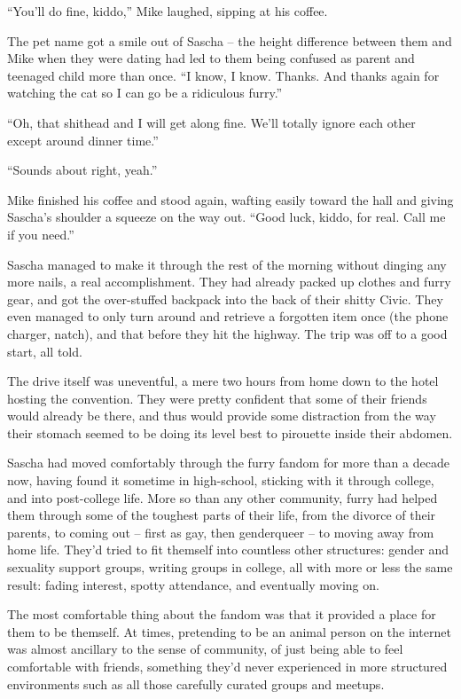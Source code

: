 ``You'll do fine, kiddo,'' Mike laughed, sipping at his coffee.

The pet name got a smile out of Sascha -- the height difference between them and Mike when they were dating had led to them being confused as parent and teenaged child more than once. ``I know, I know. Thanks. And thanks again for watching the cat so I can go be a ridiculous furry.''

``Oh, that shithead and I will get along fine. We'll totally ignore each other except around dinner time.''

``Sounds about right, yeah.''

Mike finished his coffee and stood again, wafting easily toward the hall and giving Sascha's shoulder a squeeze on the way out. ``Good luck, kiddo, for real. Call me if you need.''

\secdiv{}

Sascha managed to make it through the rest of the morning without dinging any more nails, a real accomplishment. They had already packed up clothes and furry gear, and got the over-stuffed backpack into the back of their shitty Civic. They even managed to only turn around and retrieve a forgotten item once (the phone charger, natch), and that before they hit the highway. The trip was off to a good start, all told.

The drive itself was uneventful, a mere two hours from home down to the hotel hosting the convention. They were pretty confident that some of their friends would already be there, and thus would provide some distraction from the way their stomach seemed to be doing its level best to pirouette inside their abdomen.

Sascha had moved comfortably through the furry fandom for more than a decade now, having found it sometime in high-school, sticking with it through college, and into post-college life. More so than any other community, furry had helped them through some of the toughest parts of their life, from the divorce of their parents, to coming out -- first as gay, then genderqueer -- to moving away from home life. They'd tried to fit themself into countless other structures: gender and sexuality support groups, writing groups in college, all with more or less the same result: fading interest, spotty attendance, and eventually moving on.

The most comfortable thing about the fandom was that it provided a place for them to be themself. At times, pretending to be an animal person on the internet was almost ancillary to the sense of community, of just being able to feel comfortable with friends, something they'd never experienced in more structured environments such as all those carefully curated groups and meetups.

